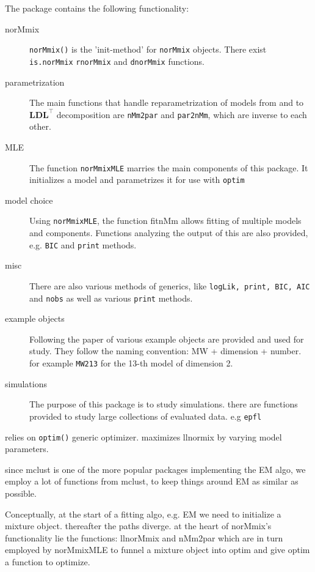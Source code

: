 The package contains the following functionality:
\begin{table}
\begin{description}
    \item [norMmix] {\tt norMmix()} is the 'init-method' for 
        {\tt norMmix} objects. There exist {\tt is.norMmix} {\tt rnorMmix} and
        {\tt dnorMmix} functions.
    \item [parametrization] The main functions that handle reparametrization
        of models from and to $\pmb{LDL}^\top$ decomposition are {\tt nMm2par}
        and {\tt par2nMm}, which are inverse to each other.
    \item [MLE] The function {\tt norMmixMLE} marries the main components of 
        this package. It initializes a model and parametrizes it for use with 
        {\tt optim}
    \item [model choice] Using {\tt norMmixMLE}, the function fitnMm allows fitting 
        of multiple models and components. Functions analyzing the output of 
        this are also provided, e.g. {\tt BIC} and {\tt print} methods.
    \item [misc] There are also various methods of generics, like {\tt logLik,
        print, BIC, AIC} and {\tt nobs} as well as various {\tt print} methods.
    \item [example objects] Following the paper of \cite{Mar92} various example
        objects are provided and used for study. They follow the naming 
        convention: MW + dimension + number. for example {\tt MW213} for the 
        13-th model of dimension 2.
    \item [simulations] The purpose of this package is to study simulations. 
        there are functions provided to study large collections of evaluated 
        data. e.g {\tt epfl} %
\end{description}
\end{table}

relies on {\tt optim()} generic optimizer. maximizes llnormix by varying model 
parameters.

since mclust is one of the more popular packages implementing the EM algo, we 
employ a lot of functions from mclust, to keep things around EM as similar as 
possible.

Conceptually, at the start of a fitting algo, e.g. EM we need to initialize a
mixture object. %
thereafter the paths diverge. at the heart of norMmix's functionality
lie the functions: llnorMmix and nMm2par which are in turn employed by 
norMmixMLE to funnel a mixture object into optim and give optim a function
to optimize.

